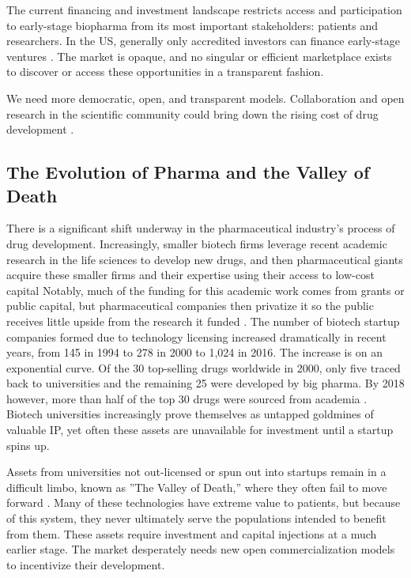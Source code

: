 \documentclass[10pt,letterpaper]{article}
\begin{document}
The current financing and investment landscape restricts access and participation to early-stage biopharma from its most important stakeholders: patients and researchers. In the US, generally only accredited investors can finance early-stage ventures \citep{Rowley2018}. The market is opaque, and no singular or efficient marketplace exists to discover or access these opportunities in a transparent fashion.

We need more democratic, open, and transparent models. Collaboration and open research in the scientific community could bring down the rising cost of drug development \citep{Bookbinder2020}. 

\subsection{The Evolution of Pharma and the Valley of Death}
There is a significant shift underway in the pharmaceutical industry’s process of drug development. Increasingly, smaller biotech firms leverage recent academic research in the life sciences to develop new drugs, and then pharmaceutical giants acquire these smaller firms and their expertise using their access to low-cost capital \citep{Huang2021} Notably, much of the funding for this academic work comes from grants or public capital, but pharmaceutical companies then privatize it so the public receives little upside from the research it funded \citep{Toole2004}. The number of biotech startup companies formed due to technology licensing increased dramatically in recent years, from 145 in 1994 to 278 in 2000 to 1,024 in 2016. The increase is on an exponential curve. Of the 30 top-selling drugs worldwide in 2000, only five traced back to universities and the remaining 25 were developed by big pharma. By 2018 however, more than half of the top 30 drugs were sourced from academia \citep{Huang2021}. Biotech universities increasingly prove themselves as untapped goldmines of valuable IP, yet often these assets are unavailable for investment until a startup spins up. 

Assets from universities not out-licensed or spun out into startups remain in a difficult limbo, known as ”The Valley of Death,” where they often fail to move forward \citep{Seyhan2019}. Many of these technologies have extreme value to patients, but because of this system, they never ultimately serve the populations intended to benefit from them. These assets require investment and capital injections at a much earlier stage. The market desperately needs new open commercialization models to incentivize their development. 
\end{document}
